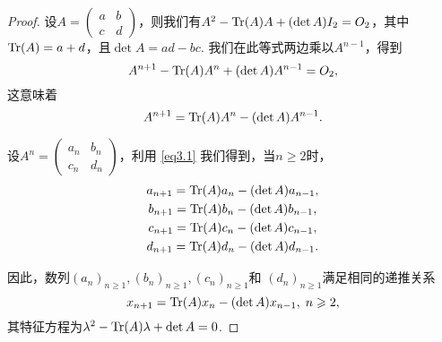 \begin{proof}
  设$A=\begin{pmatrix}
    a & b \\
    c & d
  \end{pmatrix}$，则我们有$A^2-\operatorname{Tr}(A)A+(\det A)I_2=O_2$，其中$\operatorname{Tr}(A)=a+d$，且$\det A=ad-bc$. 我们在此等式两边乘以$A^{n-1}$，得到
  \[
    A^{n+1} - \operatorname{Tr}(A)A^n + (\det A)A^{n-1} = O_2,
  \]
  这意味着
  \begin{equation}\label{eq3.1}
    A^{n+1} = \operatorname{Tr}(A)A^n - (\det A)A^{n-1}.
  \end{equation}

  设$A^n=\begin{pmatrix}
    a_n & b_n \\
    c_n & d_n
  \end{pmatrix}$，利用 \eqref{eq3.1} 我们得到，当$n\ge2$时，
  \begin{gather*}
    a_{n+1} = \operatorname{Tr}(A)a_n - (\det A)a_{n-1},\\
    b_{n+1} = \operatorname{Tr}(A)b_n - (\det A)b_{n-1},\\
    c_{n+1} = \operatorname{Tr}(A)c_n - (\det A)c_{n-1},\\
    d_{n+1} = \operatorname{Tr}(A)d_n - (\det A)d_{n-1}.
  \end{gather*}

  因此，数列$(a_n)_{n\ge1},(b_n)_{n\ge1},(c_n)_{n\ge1}$和
  $(d_n)_{n\ge1}$满足相同的递推关系
  \[
    x_{n+1} = \operatorname{Tr}(A)x_n - (\det A)x_{n-1},\; n\geqslant2,
  \]
  其特征方程为$\lambda^2-\operatorname{Tr}(A)\lambda+\det A=0$.


\end{proof}
